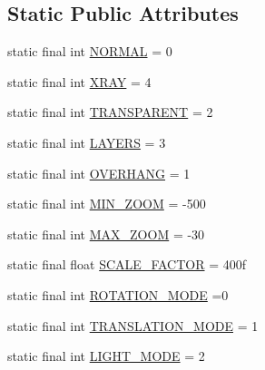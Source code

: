 \subsection*{Static Public Attributes}
\begin{DoxyCompactItemize}
\item 
static final int \hyperlink{classandroid_1_1app_1_1printerapp_1_1viewer_1_1_viewer_surface_view_aff4117a41ba72306f69b2e31673b2882}{N\+O\+R\+M\+AL} = 0
\item 
static final int \hyperlink{classandroid_1_1app_1_1printerapp_1_1viewer_1_1_viewer_surface_view_a20dddf6e7fb9ece96552e72b518bc602}{X\+R\+AY} = 4
\item 
static final int \hyperlink{classandroid_1_1app_1_1printerapp_1_1viewer_1_1_viewer_surface_view_a652bded4fc9f427c32a60d4356f37f44}{T\+R\+A\+N\+S\+P\+A\+R\+E\+NT} = 2
\item 
static final int \hyperlink{classandroid_1_1app_1_1printerapp_1_1viewer_1_1_viewer_surface_view_a3ed69bd1450359b5deb38b8536dc68b6}{L\+A\+Y\+E\+RS} = 3
\item 
static final int \hyperlink{classandroid_1_1app_1_1printerapp_1_1viewer_1_1_viewer_surface_view_a86a008f9b21cf9cae648586bb2b85d31}{O\+V\+E\+R\+H\+A\+NG} = 1
\item 
static final int \hyperlink{classandroid_1_1app_1_1printerapp_1_1viewer_1_1_viewer_surface_view_a3f139f1ec117f0980e9ea8cd5cdefaef}{M\+I\+N\+\_\+\+Z\+O\+OM} = -\/500
\item 
static final int \hyperlink{classandroid_1_1app_1_1printerapp_1_1viewer_1_1_viewer_surface_view_a8231da093e3c36166c6a7de37f238f6d}{M\+A\+X\+\_\+\+Z\+O\+OM} = -\/30
\item 
static final float \hyperlink{classandroid_1_1app_1_1printerapp_1_1viewer_1_1_viewer_surface_view_a11a6aba9148ae25902880c60a03c6500}{S\+C\+A\+L\+E\+\_\+\+F\+A\+C\+T\+OR} = 400f
\item 
static final int \hyperlink{classandroid_1_1app_1_1printerapp_1_1viewer_1_1_viewer_surface_view_a14b4d7aa7dd3075a3efa96c3629b25bc}{R\+O\+T\+A\+T\+I\+O\+N\+\_\+\+M\+O\+DE} =0
\item 
static final int \hyperlink{classandroid_1_1app_1_1printerapp_1_1viewer_1_1_viewer_surface_view_a46b7f5558a2bde24b69c0677c6ac2837}{T\+R\+A\+N\+S\+L\+A\+T\+I\+O\+N\+\_\+\+M\+O\+DE} = 1
\item 
static final int \hyperlink{classandroid_1_1app_1_1printerapp_1_1viewer_1_1_viewer_surface_view_a1751f59fd775b00fa7e7d0ba7e3beeee}{L\+I\+G\+H\+T\+\_\+\+M\+O\+DE} = 2
\item 

\end{DoxyCompactItemize}

